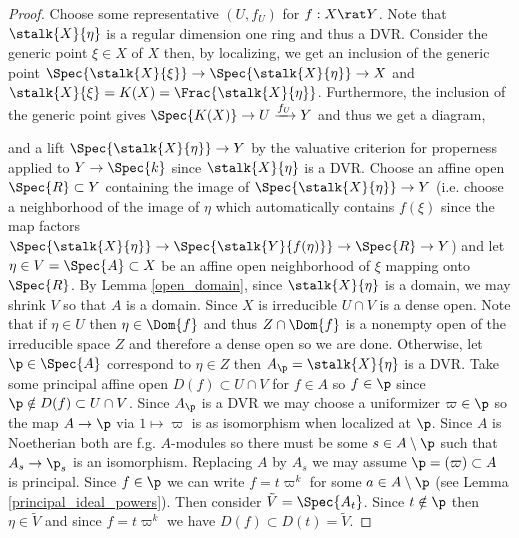 \begin{proof}
Choose some representative $(U, f_U)$ for $f : X \rat Y$. Note that $\stalk{X}{\eta}$ is a regular dimension one ring and thus a DVR. Consider the generic point $\xi \in X$ of $X$ then, by localizing, we get an inclusion of the generic point $\Spec{\stalk{X}{\xi}} \to \Spec{\stalk{X}{\eta}} \to X$ and $\stalk{X}{\xi} = K(X) = \Frac{\stalk{X}{\eta}}$. Furthermore, the inclusion of the generic point gives $\Spec{K(X)} \to U \xrightarrow{f_U} Y$ and thus we get a diagram,
\begin{center}
\end{center}
and a lift $\Spec{\stalk{X}{\eta}} \to Y$ by the valuative criterion for properness applied to $Y \to \Spec{k}$ since $\stalk{X}{\eta}$ is a DVR. Choose an affine open $\Spec{R} \subset Y$ containing the image of $\Spec{\stalk{X}{\eta}} \to Y$ (i.e. choose a neighborhood of the image of $\eta$ which automatically contains $f(\xi)$ since the map factors $\Spec{\stalk{X}{\eta}} \to \Spec{\stalk{Y}{f(\eta)}} \to \Spec{R} \to Y$) and let $\eta \in V = \Spec{A} \subset X$ be an affine open neighborhood of $\xi$ mapping onto $\Spec{R}$. By Lemma \ref{open_domain}, since $\stalk{X}{\eta}$ is a domain, we may shrink $V$ so that $A$ is a domain. Since $X$ is irreducible $U \cap V$ is a dense open. Note that if $\eta \in U$ then $\eta \in \Dom{f}$ and thus $Z \cap \Dom{f}$ is a nonempty open of the irreducible space $Z$ and therefore a dense open so we are done. Otherwise, let $\p \in \Spec{A}$ correspond to $\eta \in Z$ then $A_\p = \stalk{X}{\eta}$ is a  DVR. Take some principal affine open $D(f) \subset U \cap V$ for $f \in A$ so $f \in \p$ since $\p \notin D(f) \subset U \cap V$. Since $A_\p$ is a DVR we may choose a uniformizer $\varpi \in \p$ so the map $A \to \p$ via $1 \mapsto \varpi$ is as isomorphism when localized at $\p$. Since $A$ is Noetherian both are f.g. $A$-modules so there must be some $s \in A \setminus \p$ such that $A_s \to \p_s$ is an isomorphism. Replacing $A$ by $A_s$ we may assume $\p = (\varpi) \subset A$ is principal. Since $f \in \p$ we can write $f = t \varpi^k$ for some $a \in A \setminus \p$ (see Lemma \ref{principal_ideal_powers}). Then consider $\tilde{V} = \Spec{A_t}$. Since $t \notin \p$ then $\eta \in \tilde{V}$ and since $f = t \varpi^k$ we have $D(f) \subset D(t) = \tilde{V}$.

\end{proof}
